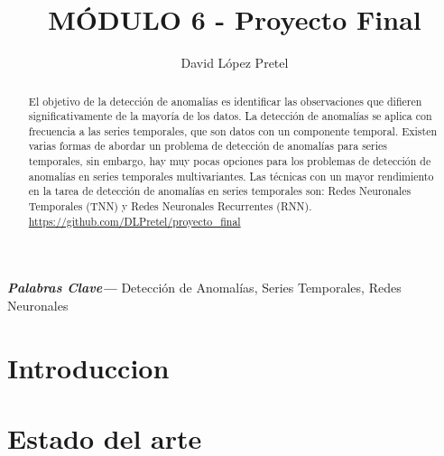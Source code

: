 \documentclass{article}
\providecommand{\keywords}[1]{\textbf{\textit{Palabras Clave---}} #1}
\begin{document}
	\title{MÓDULO 6 - Proyecto Final}
	\author{David López Pretel}
	\maketitle
	\newpage
	\tableofcontents
	\newpage
	
	\begin{abstract}
		El objetivo de la detección de anomalías es identificar las observaciones que difieren significativamente de la mayoría de los datos.
		La detección de anomalías se aplica con frecuencia a las series temporales, que son datos con un componente temporal. Existen varias formas de abordar un problema de detección de anomalías para series temporales, sin embargo, hay muy pocas opciones para los problemas de detección de anomalías en series temporales multivariantes. Las técnicas con un mayor rendimiento en la tarea de detección de anomalías en series temporales son: Redes Neuronales Temporales (TNN) y Redes Neuronales Recurrentes (RNN).\\				\url{https://github.com/DLPretel/proyecto_final}
	\end{abstract}

	\keywords{Detección de Anomalías, Series Temporales, Redes Neuronales}
	
	\section{Introduccion}
	
	
	
	\section{Estado del arte}
	
	
	
	
	
	
\end{document}
